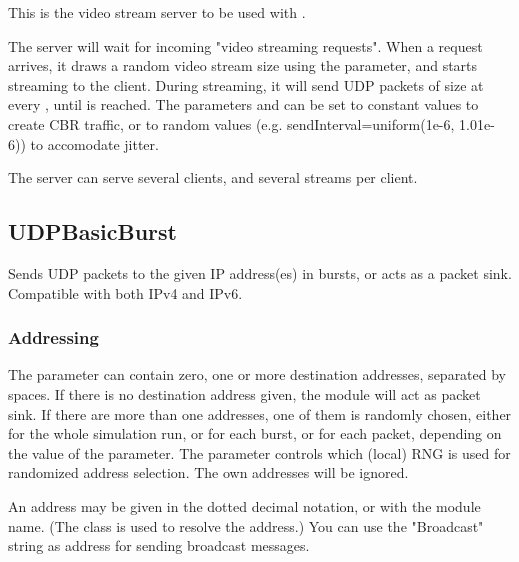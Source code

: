 This is the video stream server to be used with .

The server will wait for incoming "video streaming requests".
When a request arrives, it draws a random video stream size
using the  parameter, and starts streaming to the client.
During streaming, it will send UDP packets of size  at every
, until  is reached. The parameters 
and  can be set to constant values to create CBR traffic,
or to random values (e.g. sendInterval=uniform(1e-6, 1.01e-6)) to
accomodate jitter.

The server can serve several clients, and several streams per client.


\subsection{UDPBasicBurst}

Sends UDP packets to the given IP address(es) in bursts, or acts as a
packet sink. Compatible with both IPv4 and IPv6.

\subsubsection*{Addressing}

The  parameter can contain zero, one or more destination
addresses, separated by spaces. If there is no destination address given,
the module will act as packet sink. If there are more than one addresses,
one of them is randomly chosen, either for the whole simulation run,
or for each burst, or for each packet, depending on the value of the
 parameter. The  parameter controls which
(local) RNG is used for randomized address selection.
The own addresses will be ignored.
 
An address may be given in the dotted decimal notation, or with the module 
name. (The  class is used to resolve the address.)
You can use the "Broadcast" string as address for sending broadcast messages.

